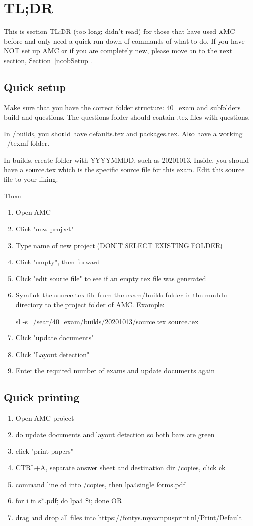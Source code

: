 \documentclass{article}
\begin{document}
\section{TL;DR}
This is section TL;DR (too long; didn't read) for those that have used AMC before and only need a quick run-down of commands of what to do. If you have NOT set up AMC or if you are completely new, please move on to the next section, Section~\ref{noobSetup}.


\subsection{\label{proSetup}Quick setup}
Make sure that you have the correct folder structure: 40\_exam and subfolders build and questions. The questions folder should contain .tex files with questions.

In /builds, you should have defaults.tex and packages.tex. Also have a working ~/texmf folder.

In builds, create folder with YYYYMMDD, such as 20201013. Inside, you should have a source.tex which is the specific source file for this exam. Edit this source file to your liking. 

Then:
	\begin{enumerate}
	\item Open AMC 
	\item Click "new project"
	\item Type name of new project (DON'T SELECT EXISTING FOLDER)
	\item Click "empty", then forward
	\item Click "edit source file" to see if an empty tex file was generated
	\item Symlink the source.tex file from the exam/builds folder in the module directory to the project folder of AMC. Example: 
	
	sl -s ~/sear/40\_exam/builds/20201013/source.tex source.tex
	\item Click "update documents"
	\item Click "Layout detection"
	\item Enter the required number of exams and update documents again
\end{enumerate}

\subsection{\label{proPrinting}Quick printing}
\begin{enumerate}
	\item Open AMC project
	\item do update documents and layout detection so both bars are green
	\item click "print papers"
	\item CTRL+A, separate answer sheet and destination dir /copies, click ok
	\item command line cd into /copies, then lpa4single forms.pdf
	\item for i in s*.pdf; do lpa4 \$i; done OR
	\item drag and drop all files into https://fontys.mycampusprint.nl/Print/Default
\end{enumerate}
\end{document}
